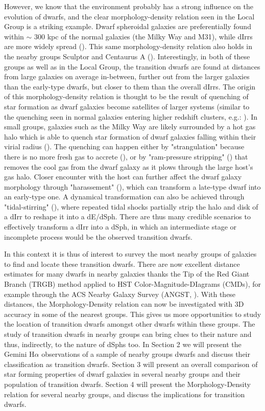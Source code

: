 \documentclass[12pt,preprint]{aastex}
\begin{document}
However, we know that the environment probably has a strong influence on the evolution of dwarfs, and the clear morphology-density relation seen in 
the Local Group is a striking example. Dwarf spheroidal galaxies are preferentially found within $\sim$ 300 kpc of the normal galaxies (the Milky Way 
and M31), while dIrrs are more widely spread (\cite{vdb94a}). This same morphology-density relation also holds in the nearby groups Sculptor and 
Centaurus A (\cite{cds09}). Interestingly, in both of these groups as well as in the Local Group, the transition dwarfs are found at distances from large 
galaxies on average in-between, further out from the larger galaxies than the early-type dwarfs, but closer to them than the overall dIrrs. The origin of this 
morphology-density relation is thought to be the result of quenching of star formation as dwarf galaxies become satellites of larger systems (similar to 
the quenching seen in normal galaxies entering higher redshift clusters, e.g.: \cite{go03}). In small groups, galaxies such as the Milky Way are likely 
surrounded by a hot gas halo which is able to quench star formation of dwarf galaxies falling within their virial radius (\cite{grp09}). The quenching can 
happen either by "strangulation" because there is no more fresh gas to accrete (\cite{ltc80}), or by "ram-pressure stripping" (\cite{gg72}) that removes 
the cool gas from the dwarf galaxy as it plows through the large host's gas halo. Closer encounter with the host can further affect the dwarf galaxy 
morphology through "harassement" (\cite{mkldo96}), which can transform a late-type dwarf into an early-type one. A dynamical transformation can 
also be achieved through "tidal-stirring" (\cite{mgc01a}), where repeated tidal shocks partially strip the halo and disk of a dIrr to reshape it into a dE/dSph. 
There are thus many credible scenarios to effectively transform a dIrr into a dSph, in which an intermediate stage or incomplete process would be the 
observed transition dwarfs.

In this context it is thus of interest to survey the most nearby groups of galaxies to find and locate these transition dwarfs. There are now excellent 
distance estimates for many dwarfs in nearby galaxies thanks the Tip of the Red Giant Branch (TRGB) method applied to HST Color-Magnitude-DIagrams 
(CMDs), for example through the ACS Nearby Galaxy Survey (ANGST, \cite{dal09}). With these distances, the Morphology-Density relation can now be 
investigated with 3D accuracy in some of the nearest groups. This gives us more opportunities to study the location of transition dwarfs amongst other 
dwarfs within these groups. The study of transition dwarfs in nearby groups can bring clues to their nature and thus, indirectly, to the nature of dSphs
too. In Section 2 we will present the Gemini H$\alpha$ observations of a sample of nearby groups dwarfs and discuss their classification as transition 
dwarfs. Section 3 will present an overall comparison of star forming properties of dwarf galaxies in several nearby groups and their population of transition 
dwarfs. Section 4 will present the Morphology-Density relation for several nearby groups, and discuss the implications for transition dwarfs.
\end{document}
